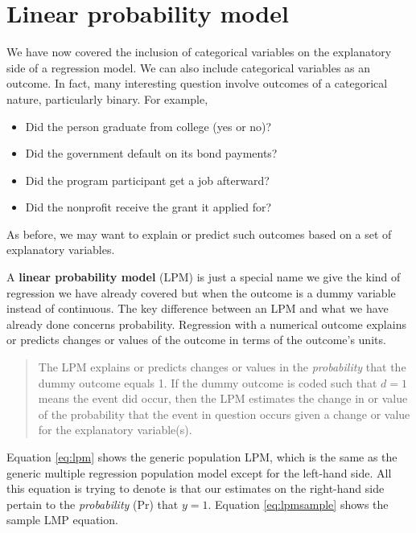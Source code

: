 \documentclass[
]{book}
\providecommand{\tightlist}{%
  \setlength{\itemsep}{0pt}\setlength{\parskip}{0pt}}
\begin{document}
\hypertarget{linear-probability-model}{%
\section{Linear probability model}\label{linear-probability-model}}

We have now covered the inclusion of categorical variables on the explanatory side of a regression model. We can also include categorical variables as an outcome. In fact, many interesting question involve outcomes of a categorical nature, particularly binary. For example,

\begin{itemize}
\tightlist
\item
  Did the person graduate from college (yes or no)?
\item
  Did the government default on its bond payments?
\item
  Did the program participant get a job afterward?
\item
  Did the nonprofit receive the grant it applied for?
\end{itemize}

As before, we may want to explain or predict such outcomes based on a set of explanatory variables.

A \textbf{linear probability model} (LPM) is just a special name we give the kind of regression we have already covered but when the outcome is a dummy variable instead of continuous. The key difference between an LPM and what we have already done concerns probability. Regression with a numerical outcome explains or predicts changes or values of the outcome in terms of the outcome's units.

\begin{quote}
The LPM explains or predicts changes or values in the \emph{probability} that the dummy outcome equals 1. If the dummy outcome is coded such that \(d=1\) means the event did occur, then the LPM estimates the change in or value of the probability that the event in question occurs given a change or value for the explanatory variable(s).
\end{quote}

Equation \eqref{eq:lpm} shows the generic population LPM, which is the same as the generic multiple regression population model except for the left-hand side. All this equation is trying to denote is that our estimates on the right-hand side pertain to the \emph{probability} (Pr) that \(y=1\). Equation \eqref{eq:lpmsample} shows the sample LMP equation.
\end{document}
